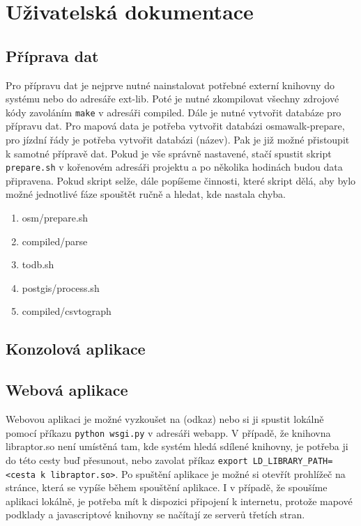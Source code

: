 \chapter{Uživatelská dokumentace}
\section{Příprava dat}
Pro přípravu dat je nejprve nutné nainstalovat potřebné externí knihovny do
systému nebo do adresáře ext-lib. Poté je nutné zkompilovat všechny zdrojové
kódy zavoláním {\tt make} v adresáři compiled. Dále je nutné vytvořit databáze
pro přípravu dat. Pro mapová data je potřeba vytvořit databázi osmawalk-prepare,
pro jízdní řády je potřeba vytvořit databázi (\TODO název). Pak je již možné
přistoupit k samotné přípravě dat. Pokud je vše správně nastavené, stačí spustit
skript {\tt prepare.sh} v kořenovém adresáři projektu a po několika hodinách
budou data připravena. Pokud skript selže, dále popíšeme činnosti, které skript
dělá, aby bylo možné jednotlivé fáze spouštět ručně a hledat, kde nastala chyba.

\begin{enumerate}
\item osm/prepare.sh
\item compiled/parse
\item todb.sh
\item postgis/process.sh
\item compiled/csvtograph

\end{enumerate}
\section{Konzolová aplikace}
\section{Webová aplikace}
Webovou aplikaci je možné vyzkoušet na (\TODO odkaz) nebo si ji spustit lokálně
pomocí příkazu {\tt python wsgi.py} v adresáři webapp. V případě, že knihovna
libraptor.so není umístěná tam, kde systém hledá sdílené knihovny, je potřeba ji
do této cesty buď přesunout, nebo zavolat příkaz {\tt export
LD\_LIBRARY\_PATH=<cesta k libraptor.so>}. Po spuštění aplikace je možné si
otevřít prohlížeč na stránce, která se vypíše během spouštění aplikace. I v
případě, že spoušíme aplikaci lokálně, je potřeba mít k dispozici připojení k
internetu, protože mapové podklady a javascriptové knihovny se načítají ze
serverů třetích stran.

